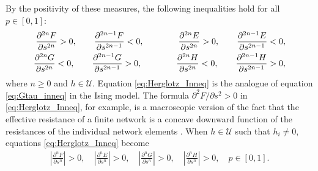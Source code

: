 \documentclass[english,12pt]{ttuthes}
\begin{document}
By the positivity of these measures, the following inequalities hold
for all $p\in[0,1]$: 
%
\begin{align}\label{eq:Herglotz_Inneq}
  \frac{\partial^{2n}F}{\partial s^{2n}}>0, \qquad
  \frac{\partial^{2n-1}F}{\partial s^{2n-1}}<0,
    \qquad \qquad
  \frac{\partial^{2n}E}{\partial s^{2n}}>0,\qquad
  \frac{\partial^{2n-1}E}{\partial s^{2n-1}}<0,
    \\ 
  \frac{\partial^{2n}G}{\partial s^{2n}}<0, \qquad
  \frac{\partial^{2n-1}G}{\partial s^{2n-1}}>0,
    \qquad \qquad
  \frac{\partial^{2n}H}{\partial s^{2n}}<0, \qquad
  \frac{\partial^{2n-1}H}{\partial s^{2n-1}}>0,
  \notag
\end{align}
%
where $n\geq0$ and $h\in\mathcal{U}$. Equation
\eqref{eq:Herglotz_Inneq} is the analogue of equation
\eqref{eq:Gtau_inneq} in the Ising model. The formula $\partial^2F/\partial s^2>0$
in \eqref{eq:Herglotz_Inneq}, for example, is a macroscopic version of
the fact that the effective resistance of a finite network is a
concave downward function of the resistances of the individual network
elements \cite{Golden:JMP-5627}. When $h\in\mathcal{U}$ such that $h_i\neq0$,
equations \eqref{eq:Herglotz_Inneq} become
%
\begin{align}\label{eq:Herglotz_NonZero}
  \left|\frac{\partial^nF}{\partial s^n}\right|>0, \quad
  \left|\frac{\partial^nE}{\partial s^n}\right|>0, \quad
  \left|\frac{\partial^nG}{\partial s^n}\right|>0, \quad
  \left|\frac{\partial^nH}{\partial s^n}\right|>0, \quad p\in[0,1].
\end{align}
%
\end{document}
